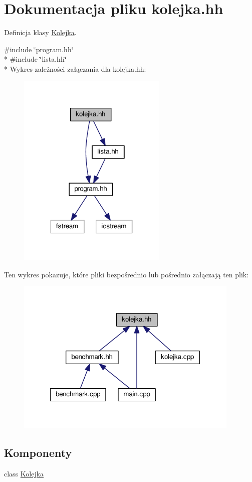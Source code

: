 \hypertarget{kolejka_8hh}{\section{Dokumentacja pliku kolejka.\-hh}
\label{kolejka_8hh}
}


Definicja klasy \hyperlink{class_kolejka}{Kolejka}.  


{\ttfamily \#include \char`\"{}program.\-hh\char`\"{}}\\*
{\ttfamily \#include \char`\"{}lista.\-hh\char`\"{}}\\*
Wykres zależności załączania dla kolejka.\-hh\-:\nopagebreak
\begin{figure}[H]
\begin{center}
\leavevmode
\includegraphics[width=202pt]{kolejka_8hh__incl}
\end{center}
\end{figure}
Ten wykres pokazuje, które pliki bezpośrednio lub pośrednio załączają ten plik\-:\nopagebreak
\begin{figure}[H]
\begin{center}
\leavevmode
\includegraphics[width=303pt]{kolejka_8hh__dep__incl}
\end{center}
\end{figure}
\subsection*{Komponenty}
\begin{DoxyCompactItemize}
\item 
class \hyperlink{class_kolejka}{Kolejka}
\end{DoxyCompactItemize}
